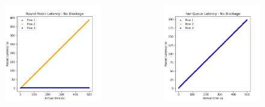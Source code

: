 \documentclass[compress]{beamer}
\begin{document}
\begin{frame}
\begin{columns}
\begin{column}{0.32\textwidth}
\begin{figure}
                    \includegraphics[width=\textwidth]{img/rr_equal}
                \end{figure}
            \end{column}
            \begin{column}{0.32\textwidth}
                \begin{figure}
                    \centering
                    \includegraphics[width=\textwidth]{img/fq_equal}
                \end{figure}
            \end{column}
        \end{columns}
    \end{frame}
\end{document}
